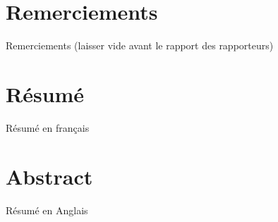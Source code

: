 \documentclass[a4paper,11pt]{book}
\begin{document}
    \thesisTitle
    
	\section*{Remerciements}
        Remerciements (laisser vide avant le rapport des rapporteurs)
	\newpage
	\section*{Résumé}

	   Résumé en français

	\section*{Abstract}

	   Résumé en Anglais

	\tableofcontents

    

	
    
\end{document}
